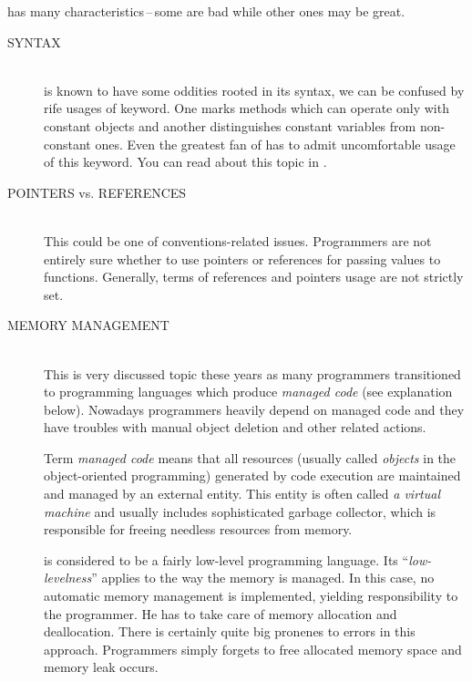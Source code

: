 \cpp{} has many characteristics\,--\,some are bad while other ones may be great.
\begin{description}
\item[SYNTAX\ts{\textcolor{red}{bad}}]\hfill \\
\cpp{} is known to have some oddities rooted in its syntax, \eg we can be confused by rife usages of keyword. One marks methods which can operate only with constant objects and another distinguishes constant variables from non-constant ones. Even the greatest fan of \cpp{} has to admit uncomfortable usage of this keyword. You can read about this topic in \citep[p.~90--92, p.~537]{prata:cprimer}.

\item[POINTERS vs. REFERENCES\ts{\textcolor{red}{bad}}]\hfill \\
This could be one of conventions-related issues. Programmers are not entirely sure whether to use pointers or references for passing values to functions. Generally, terms of references and pointers usage are not strictly set.

\item[MEMORY MANAGEMENT\ts{\textcolor{red}{bad}, \textcolor{ultragreen}{good}}]\hfill \\
This is very discussed topic these years as many programmers transitioned to programming languages which produce
\emph{managed code} (see explanation below). Nowadays programmers heavily depend on managed code and they have troubles with manual
object deletion and other related actions.

\begin{fdocextra}
Term \textit{managed code} means that all resources (usually called \emph{objects} in the object-oriented programming) generated by code execution are maintained and managed by an external entity. This entity is often called \emph{a virtual machine} and usually includes sophisticated garbage collector, which is responsible for freeing needless resources from memory.
\end{fdocextra}

\cpp{} is considered to be a fairly low-level programming language. Its \enquote{\textit{low-levelness}} applies to the way the memory is managed. In this case, no automatic memory management is implemented, yielding responsibility to the programmer. He has to take care of memory allocation and deallocation. There is certainly quite big pronenes to errors in this approach. Programmers simply forgets to free allocated memory space and memory leak occurs.


\end{description}
